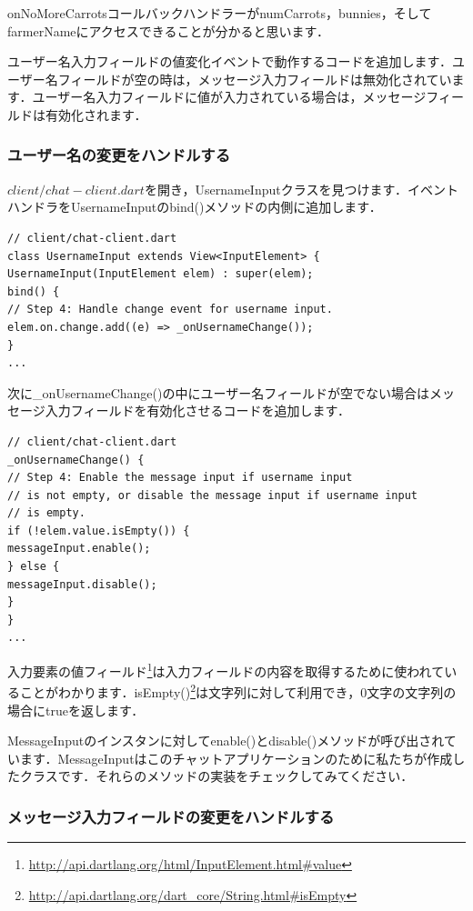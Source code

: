 onNoMoreCarrotsコールバックハンドラーがnumCarrots，bunnies，そしてfarmerNameにアクセスできることが分かると思います．

ユーザー名入力フィールドの値変化イベントで動作するコードを追加します．ユーザー名フィールドが空の時は，メッセージ入力フィールドは無効化されています．ユーザー名入力フィールドに値が入力されている場合は，メッセージフィールドは有効化されます．

\subsubsection{ユーザー名の変更をハンドルする}

$ client/chat-client.dart $を開き，UsernameInputクラスを見つけます．イベントハンドラをUsernameInputのbind()メソッドの内側に追加します．

\begin{verbatim}
// client/chat-client.dart
class UsernameInput extends View<InputElement> {
UsernameInput(InputElement elem) : super(elem);
bind() {
// Step 4: Handle change event for username input.
elem.on.change.add((e) => _onUsernameChange());
}
...
\end{verbatim}

次に\_onUsernameChange()の中にユーザー名フィールドが空でない場合はメッセージ入力フィールドを有効化させるコードを追加します．

\begin{verbatim}
// client/chat-client.dart
_onUsernameChange() {
// Step 4: Enable the message input if username input
// is not empty, or disable the message input if username input
// is empty.
if (!elem.value.isEmpty()) {
messageInput.enable();
} else {
messageInput.disable();
}
}
...
\end{verbatim}

入力要素の値フィールド\footnote{\url{http://api.dartlang.org/html/InputElement.html#value}}は入力フィールドの内容を取得するために使われていることがわかります．isEmpty()\footnote{\url{http://api.dartlang.org/dart_core/String.html#isEmpty}}は文字列に対して利用でき，0文字の文字列の場合にtrueを返します．

MessageInputのインスタンに対してenable()とdisable()メソッドが呼び出されています．MessageInputはこのチャットアプリケーションのために私たちが作成したクラスです．それらのメソッドの実装をチェックしてみてください．

\subsubsection{メッセージ入力フィールドの変更をハンドルする}


